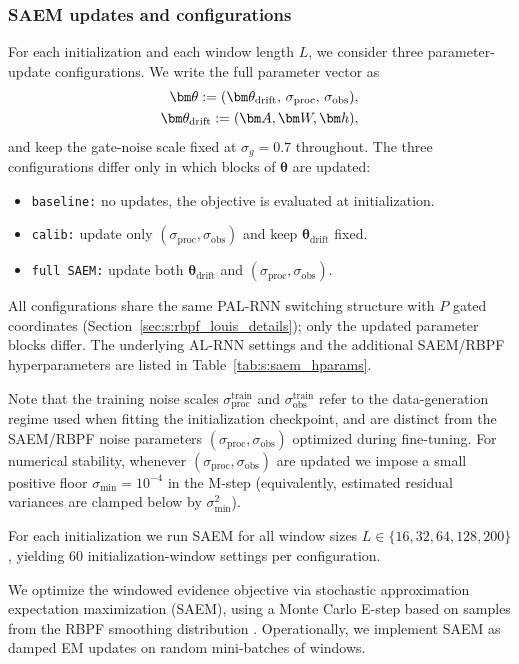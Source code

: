 \documentclass[twoside]{article}
\theoremstyle{plain}
\theoremstyle{definition}
\theoremstyle{remark}
\begin{document}
\subsubsection{SAEM updates and configurations}
For each initialization and each window length $L$, we consider three parameter-update configurations.
We write the full parameter vector as
\begin{align}
\bm\theta := (\bm\theta_{\mathrm{drift}},\,\sigma_{\mathrm{proc}},\,\sigma_{\mathrm{obs}}),\notag\\
\bm\theta_{\mathrm{drift}}:=(\bm A,\bm W,\bm h),
\end{align}
and keep the gate-noise scale fixed at $\sigma_g=0.7$ throughout.
The three configurations differ only in which blocks of $\bm\theta$ are updated:
\begin{itemize}
	\item \texttt{baseline:} no updates, the objective is evaluated at initialization. 
	\item \texttt{calib:} update only $(\sigma_{\mathrm{proc}},\sigma_{\mathrm{obs}})$ and keep $\bm\theta_{\mathrm{drift}}$ fixed.
	\item \texttt{full SAEM:} update both $\bm\theta_{\mathrm{drift}}$ and $(\sigma_{\mathrm{proc}},\sigma_{\mathrm{obs}})$.
\end{itemize}
All configurations share the same PAL-RNN switching structure with $P$ gated coordinates (Section~\ref{sec:s:rbpf_louis_details}); only the updated parameter blocks differ. The underlying AL-RNN settings and the additional SAEM/RBPF hyperparameters are listed in Table~\ref{tab:s:saem_hparams}.

Note that the training noise scales $\sigma_{\mathrm{proc}}^{\mathrm{train}}$ and $\sigma_{\mathrm{obs}}^{\mathrm{train}}$ refer to the data-generation regime used when fitting the initialization checkpoint, and are distinct from the SAEM/RBPF noise parameters $(\sigma_{\mathrm{proc}},\sigma_{\mathrm{obs}})$ optimized during fine-tuning. For numerical stability, whenever $(\sigma_{\mathrm{proc}},\sigma_{\mathrm{obs}})$ are updated we impose a small positive floor $\sigma_{\min}=10^{-4}$ in the M-step (equivalently, estimated residual variances are clamped below by $\sigma_{\min}^2$).

For each initialization we run SAEM for all window sizes
$L\in\{16,32,64,128,200\}$, yielding 60 initialization-window settings per configuration.

We optimize the windowed evidence objective via stochastic approximation expectation maximization (SAEM), using a Monte Carlo E-step based on samples from the RBPF smoothing distribution \citep{delyon1999saem}. Operationally, we implement SAEM as damped EM updates on random mini-batches of windows.
\end{document}
